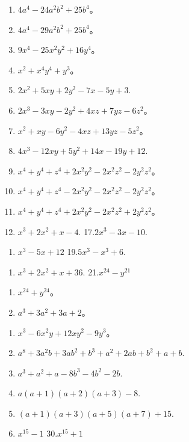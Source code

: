 \begin{enumerate}[start=5]
\item
  \(4a^{4} - 24a^{2}b^{2} + 25b^{4}\)。
\item
  \(4a^{4} - 29a^{2}b^{2} + 25b^{4}\)。
\item
  \(9x^{4} - 25x^{2}y^{2} + 16y^{4}\)。
\item
  \(x^{2} + x^{4}y^{4} + y^{3}\)。
\item
  \(2x^{2} + 5xy + 2y^{2} - 7x - 5y + 3.\)
\item
  \(2x^{3} - 3xy - 2y^{2} + 4xz + 7yz - 6z^{2}\)。
\item
  \(x^{2} + xy - 6y^{2} - 4xz + 13yz - 5z^{2}\)。
\item
  \(4x^{3} - 12xy + 5y^{2} + 14x - 19y + 12.\)
\item
  \(x^{4} + y^{4} + z^{4} + 2x^{2}y^{2} - 2x^{2}z^{2} - 2y^{2}z^{2}\)。
\item
  \(x^{4} + y^{4} + z^{4} - 2x^{2}y^{2} - 2x^{2}z^{2} - 2y^{2}z^{2}\)。
\item
  \(x^{4} + y^{4} + z^{4} + 2x^{2}y^{2} - 2x^{2}z^{2} + 2y^{2}z^{2}\)。
\item
  \(x^{3} + 2x^{2} + x - 4.\) 17.\(2x^{3} - 3x - 10.\)
\end{enumerate}

\begin{enumerate}[start=18]
\item
  \(x^{3} - 5x + 12\) 19.\(5x^{3} - x^{3} + 6.\)
\end{enumerate}

\begin{enumerate}[start=20]
\item
  \(x^{3} + 2x^{2} + x + 36.\) 21.\(x^{24} - y^{21}\)
\end{enumerate}

\begin{enumerate}[start=22]
\item
  \(x^{24} + y^{24}\)。
\item
  \(a^3 + 3a^2 + 3a + 2\)。
\end{enumerate}

\begin{enumerate}[start=24]
\item
  \(x^{3} - 6x^{2}y + 12xy^{2} - 9y^{3}\)。
\item
  \(a^8 + 3a^2b + 3ab^2 + b^3 + a^2 + 2ab + b^2 + a + b.\)
\item
  \(a^3 + a^2 + a - 8b^3 - 4b^2 - 2b.\)
\item
  \(a(a + 1)(a + 2)(a + 3) - 8.\)
\item
  \((a + 1)(a + 3)(a + 5)(a + 7) + 15.\)
\item
  \(x^{15} - 1\) 30.\(x^{15} + 1\)
\end{enumerate}

